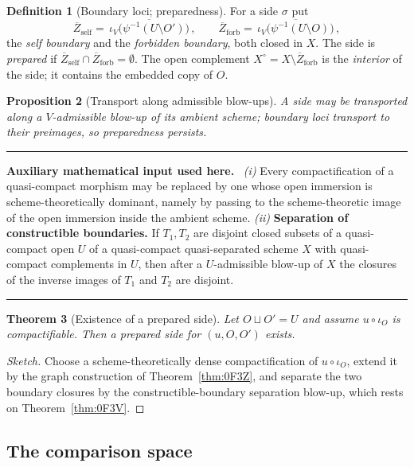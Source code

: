 \documentclass[11pt,a4paper]{article}
\theoremstyle{plain}
\newtheorem{theorem}{Theorem}[section]
\newtheorem{proposition}[theorem]{Proposition}
\theoremstyle{definition}
\newtheorem{definition}[theorem]{Definition}
\theoremstyle{remark}
\newenvironment{auxinput}{%
  \par\medskip\begingroup\interlinepenalty=10000\relax
  \noindent\textcolor{orange!70!black}{\rule{\linewidth}{0.9pt}}%
  \par\nopagebreak\smallskip\noindent
  \textbf{Auxiliary mathematical input used here.}\ \ignorespaces}%
  {\par\nopagebreak\smallskip\nopagebreak\noindent
   \textcolor{orange!70!black}{\rule{\linewidth}{0.9pt}}\par\endgroup\medskip}
\newcommand{\qcqs}{quasi-compact quasi-separated}
\begin{document}
\begin{definition}[Boundary loci; preparedness]
\label{def:boundaries}
For a side $\sigma$ put
\[
  \overline{Z}_{\mathrm{self}}=\overline{\,\iota_V\bigl(\psi^{-1}(U\setminus O')\bigr)\,},
  \qquad
  \overline{Z}_{\mathrm{forb}}=\overline{\,\iota_V\bigl(\psi^{-1}(U\setminus O)\bigr)\,},
\]
the \emph{self boundary} and the \emph{forbidden boundary}, both closed in $X$.
The side is \emph{prepared} if
$\overline{Z}_{\mathrm{self}}\cap\overline{Z}_{\mathrm{forb}}=\emptyset$. The
open complement $X^{\circ}=X\setminus\overline{Z}_{\mathrm{forb}}$ is the
\emph{interior} of the side; it contains the embedded copy of $O$.
\end{definition}

\begin{proposition}[Transport along admissible blow-ups]
\label{prop:side-transport}
A side may be transported along a $V$-admissible blow-up of its ambient scheme;
boundary loci transport to their preimages, so preparedness persists.
\end{proposition}

\begin{auxinput}
\emph{(i)} Every compactification of a quasi-compact morphism may be replaced by
one whose open immersion is scheme-theoretically dominant, namely by passing to
the scheme-theoretic image of the open immersion inside the ambient scheme.
\emph{(ii)} \textbf{Separation of constructible boundaries.} If $T_1,T_2$ are
disjoint closed subsets of a quasi-compact open $U$ of a \qcqs{} scheme $X$
with quasi-compact complements in $U$, then after a $U$-admissible blow-up of
$X$ the closures of the inverse images of $T_1$ and $T_2$ are disjoint.
\end{auxinput}

\begin{theorem}[Existence of a prepared side]
\label{thm:prepared-side}
Let $O\sqcup O'=U$ and assume $u\circ\iota_O$ is compactifiable. Then a prepared
side for $(u,O,O')$ exists.
\end{theorem}

\begin{proof}[Sketch]
Choose a scheme-theoretically dense compactification of $u\circ\iota_O$, extend
it by the graph construction of Theorem~\ref{thm:0F3Z}, and separate the two
boundary closures by the constructible-boundary separation blow-up, which rests
on Theorem~\ref{thm:0F3V}.
\end{proof}

\subsection{The comparison space}
\end{document}
